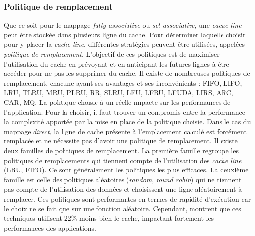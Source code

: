 \subsubsection{Politique de remplacement}
Que ce soit pour le mappage \textit{fully associative} ou \textit{set associative}, une \textit{cache line} peut être stockée dans plusieurs ligne du cache. Pour déterminer laquelle choisir pour y placer la \textit{cache line}, différentes stratégies peuvent être utilisées, appelées \textit{politique de remplacement}. L'objectif de ces politiques est de maximiser l'utilisation du cache en prévoyant et en anticipant les futures lignes à être accéder pour ne pas les supprimer du cache. Il existe de nombreuses politiques de remplacement, chacune ayant ses avantages et ses inconvénients \cite{wikipedia2_2019}: FIFO, LIFO, LRU, TLRU, MRU, PLRU, RR, SLRU, LFU, LFRU, LFUDA, LIRS, ARC, CAR, MQ. La politique choisie à un réelle impacte sur les performances de l'application. Pour la choisir, il faut trouver un compromis entre la performance la complexité apportée par la mise en place de la politique choisie. Dans le cas du mappage \textit{direct}, la ligne de cache présente à l'emplacement calculé est forcément remplacée et ne nécessite pas d'avoir une politique de remplacement. Il existe deux familles de politiques de remplacement. La première famille regroupe les politiques de remplacements qui tiennent compte de l'utilisation des \textit{cache line} (LRU, FIFO). Ce sont généralement les politiques les plus efficaces. La deuxième famille est celle des politiques aléatoires (\textit{random}, \textit{round robin}) qui ne tiennent pas compte de l'utilisation des données et choisissent une ligne aléatoirement à remplacer. Ces politiques sont performantes en termes de rapidité d'exécution car le choix ne se fait que sur une fonction aléatoire. Cependant, \cite{Al-Zoubi:2004:PEC:986537.986601} montrent que ces techniques utilisent 22\% moins bien le cache, impactant fortement les performances des applications.



